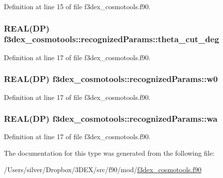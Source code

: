 Definition at line 15 of file f3dex\_\-cosmotools.f90.

\hypertarget{typef3dex__cosmotools_1_1recognized_params_ad67dc289e96be582ba36b4a960d36467}{
\subsubsection[{theta\_\-cut\_\-deg}]{\setlength{\rightskip}{0pt plus 5cm}REAL(DP) {\bf f3dex\_\-cosmotools::recognizedParams::theta\_\-cut\_\-deg}}}
\label{typef3dex__cosmotools_1_1recognized_params_ad67dc289e96be582ba36b4a960d36467}


Definition at line 17 of file f3dex\_\-cosmotools.f90.

\hypertarget{typef3dex__cosmotools_1_1recognized_params_acd2fc10976a6a78c250ab29f9a2fa547}{
\subsubsection[{w0}]{\setlength{\rightskip}{0pt plus 5cm}REAL(DP) {\bf f3dex\_\-cosmotools::recognizedParams::w0}}}
\label{typef3dex__cosmotools_1_1recognized_params_acd2fc10976a6a78c250ab29f9a2fa547}


Definition at line 17 of file f3dex\_\-cosmotools.f90.

\hypertarget{typef3dex__cosmotools_1_1recognized_params_a3e31572d077d164d5b2b6c62a772a6ba}{
\subsubsection[{wa}]{\setlength{\rightskip}{0pt plus 5cm}REAL(DP) {\bf f3dex\_\-cosmotools::recognizedParams::wa}}}
\label{typef3dex__cosmotools_1_1recognized_params_a3e31572d077d164d5b2b6c62a772a6ba}


Definition at line 17 of file f3dex\_\-cosmotools.f90.



The documentation for this type was generated from the following file:\begin{DoxyCompactItemize}
\item 
/Users/silver/Dropbox/3DEX/src/f90/mod/\hyperlink{f3dex__cosmotools_8f90}{f3dex\_\-cosmotools.f90}\end{DoxyCompactItemize}
